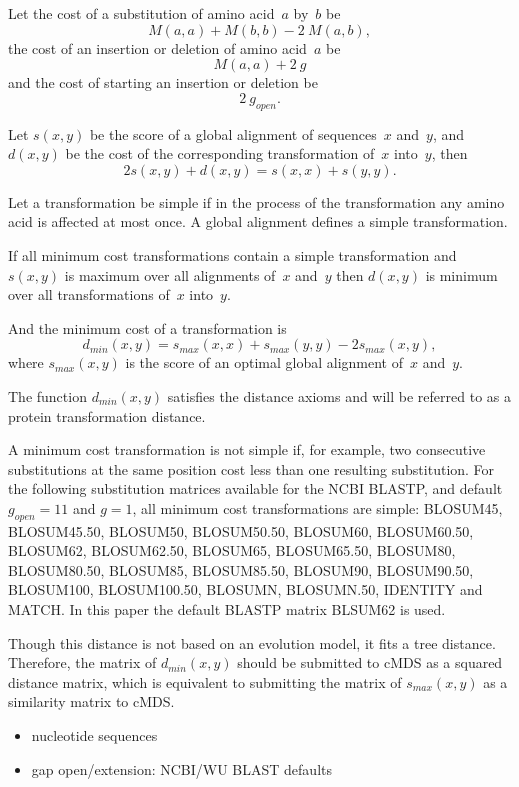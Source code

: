 \documentclass[10pt,a4paper]{article}
\begin{document}
Let the cost of a substitution of amino acid~$a$ by~$b$ be
$$ M(a,a) + M(b,b) - 2 \ M(a,b), $$
the cost of an insertion or deletion of amino acid~$a$ be
$$ M(a,a) + 2 \ g $$
and the cost of starting an insertion or deletion be
$$ 2 \ g_{open}. $$

Let $s(x,y)$ be the score of a global alignment of sequences~$x$ and~$y$, and $d(x,y)$ be the cost of the corresponding transformation of~$x$ into~$y$,
then
$$ 2 s(x,y) + d(x,y) = s(x,x) + s(y,y). $$

Let a transformation be simple if in the process of the transformation any amino acid is affected at most once.
A global alignment defines a simple transformation.

If all minimum cost transformations contain a simple transformation and $s(x,y)$ is maximum over all alignments of~$x$ and~$y$
then $d(x,y)$ is minimum over all transformations of~$x$ into~$y$.

And the minimum cost of a transformation is
$$ d_{min}(x,y) = s_{max}(x,x) + s_{max}(y,y) - 2 s_{max}(x,y), $$
where $s_{max}(x,y)$ is the score of an optimal global alignment of~$x$ and~$y$.

The function $d_{min}(x,y)$ satisfies the distance axioms and will be referred to as a protein transformation distance.

A minimum cost transformation is not simple if, for example, two consecutive substitutions at the same position cost less than one resulting substitution.
For the following substitution matrices available for the NCBI BLASTP, and default $g_{open} = 11$ and $g = 1$,
all minimum cost transformations are simple:
BLOSUM45, BLOSUM45.50, BLOSUM50, BLOSUM50.50, BLOSUM60, BLOSUM60.50, BLOSUM62, BLOSUM62.50, BLOSUM65, BLOSUM65.50, BLOSUM80, BLOSUM80.50, BLOSUM85, BLOSUM85.50,
BLOSUM90, BLOSUM90.50, BLOSUM100, BLOSUM100.50, BLOSUMN, BLOSUMN.50, IDENTITY and MATCH.
In this paper the default BLASTP matrix BLSUM62 is used.

Though this distance is not based on an evolution model, it fits a tree distance.
Therefore, the matrix of $d_{min}(x,y)$ should be submitted to cMDS as a squared distance matrix,
which is equivalent to submitting the matrix of $s_{max}(x,y)$ as a similarity matrix to cMDS.

\comm
{
\begin{itemize}
  \item nucleotide sequences
  \item gap open/extension: NCBI/WU BLAST defaults
\end{itemize}
}
\end{document}
